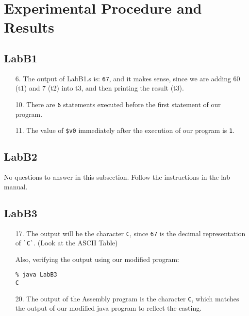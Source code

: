 \documentclass{article}
\begin{document}

\section{Experimental Procedure and Results}

\subsection{LabB1}
\begin{enumerate}
\item[6. ] The output of LabB1.s is: \verb$67$, and it makes sense, since we are adding 60 (t1) and 7 (t2) into t3, and then printing the result (t3).

\item[10. ] There are \verb$6$ statements executed before the first statement of our program.

\item[11. ] The value of \verb#$v0# immediately after the execution of our program is \verb$1$.
\end{enumerate}

\subsection{LabB2}
No questions to answer in this subsection. Follow the instructions in the lab manual.

\subsection{LabB3}
\begin{enumerate}
\item[17. ] The output will be the character \verb$C$, since \verb$67$ is the decimal representation of \verb$`C`$. (Look at the ASCII Table)\newline

Also, verifying the output using our modified program:
\begin{verbatim}
% java LabB3
C
\end{verbatim}

\item[20. ] The output of the Assembly program is the character \verb$C$, which matches the output of our modified java program to reflect the casting.
\end{enumerate}
\end{document}
